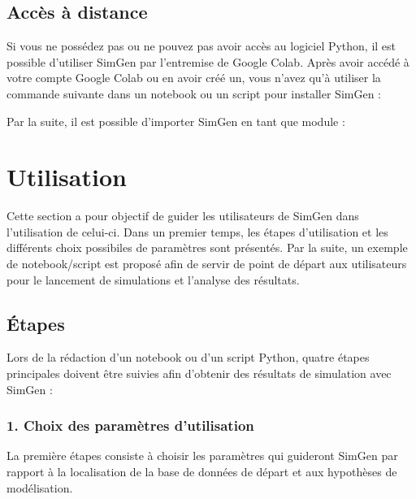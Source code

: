\documentclass[letterpaper,10pt,french]{sphinxmanual}
\begin{document}
\section{Accès à distance}
\label{\detokenize{installation:acces-a-distance}}
Si vous ne possédez pas ou ne pouvez pas avoir accès au logiciel Python,
il est possible d’utiliser SimGen par l’entremise de Google Colab.
Après avoir accédé à votre compte Google Colab ou en avoir créé un, vous n’avez
qu’à utiliser la commande suivante dans un notebook ou un script pour installer SimGen :

\begin{sphinxVerbatim}[commandchars=\\\{\}]
  
\end{sphinxVerbatim}

Par la suite, il est possible d’importer SimGen en tant que module :

\begin{sphinxVerbatim}[commandchars=\\\{\}]
 
\end{sphinxVerbatim}


\chapter{Utilisation}
\label{\detokenize{utilisation:utilisation}}\label{\detokenize{utilisation:id1}}\label{\detokenize{utilisation::doc}}
Cette section a pour objectif de guider les utilisateurs de SimGen dans l’utilisation de celui-ci.
Dans un premier temps, les étapes d’utilisation et les différents choix possibiles de paramètres sont présentés.
Par la suite, un exemple de notebook/script est proposé afin de servir de point de départ
aux utilisateurs pour le lancement de simulations et l’analyse des résultats.


\section{Étapes}
\label{\detokenize{utilisation:etapes}}
Lors de la rédaction d’un notebook ou d’un script Python, quatre étapes principales doivent être suivies afin d’obtenir des résultats de simulation avec SimGen :


\subsection{1. Choix des paramètres d’utilisation}
\label{\detokenize{utilisation:choix-des-parametres-d-utilisation}}
La première étapes consiste à choisir les paramètres qui guideront SimGen par rapport à la localisation de la base de données de départ et
aux hypothèses de modélisation.
\end{document}
